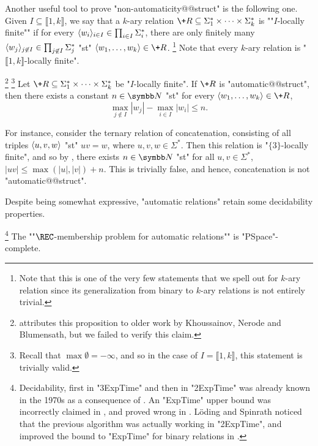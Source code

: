 Another useful tool to prove "non-automaticity@@struct" is the following one.
Given $I \subseteq \lBrack 1,k\rBrack$,
we say that a $k$-ary relation $\+R \subseteq \Sigma_1^* \times \cdots \times \Sigma_k^*$ is
""$I$-locally finite"" if for every $\langle w_i\rangle_{i\in I} \in \prod_{i\in I} \Sigma_i^*$,
there are only finitely many $\langle w_j\rangle_{j\not\in I} \in \prod_{j \not\in I} \Sigma_j^*$
"st" $\tup{w_1,\hdots,w_k} \in \+R$.%
\footnote{Note that this is one of the very few statements
that we spell out for $k$-ary relation since its generalization from binary to $k$-ary relations
is not entirely trivial.}
Note that every $k$-ary relation is "$\lBrack 1,k\rBrack$-locally finite".
\begin{proposition}
	\label{prop:non-synchronous}
	\!\footnote{\cite{KhoussainovNiesRubinStephan2007Automatic} attributes this proposition
	to older work by Khoussainov, Nerode and Blumensath, but we failed to verify this claim.}%
	\footnote{Recall that $\max{\emptyset} = -\infty$, and so in the case
	of $I = \lBrack 1,k\rBrack$, this statement is trivially valid.}
	\AP\label{prop:bound-automatic-structures}
	Let $\+R \subseteq \Sigma_1^* \times \cdots \times \Sigma_k^*$ be "$I$-locally finite".
	If $\+R$ is "automatic@@struct", then there exists a constant $n\in\N$ "st" for every
	$\tup{w_1,\hdots,w_k} \in \+R$,
	\[
		\max_{j \not\in I}{|w_j|} - \max_{i \in I}{|w_i|} \leq n.
	\]
\end{proposition}

For instance, consider the ternary relation of concatenation,
consisting of all triples $\langle u,v,w\rangle$ "st" $uv = w$, where $u,v,w\in\Sigma^*$.
Then this relation is "$\{3\}$-locally finite", and so by
, there exists $n\in \N$
"st" for all $u,v \in \Sigma^*$, $|uv| \leq \max{(|u|,|v|)} + n$.
This is trivially false, and hence, concatenation is not "automatic@@struct".

Despite being somewhat expressive, "automatic relations" retain some decidability properties. 
\begin{proposition}
	\!\footnote{Decidability, first in "3ExpTime" and then
	in "2ExpTime" was already known in the 1970s as a consequence
	of .
	An "ExpTime" upper bound was incorrectly claimed in \cite[Table~1]{CartonChoffrutGrigorieff2006DecisionProblems},
	and proved wrong in \cite[\S~4.1]{LodingSpinrath2019DecisionProblems}.
	Löding and Spinrath noticed that the previous algorithm was
	actually working in "2ExpTime", and improved 
	the bound to "ExpTime" for binary relations
	in \cite[Corollary~22]{LodingSpinrath2019DecisionProblems}.}
	The ""$\REC$-membership problem for automatic relations"" is "PSpace"-complete.
\end{proposition}

